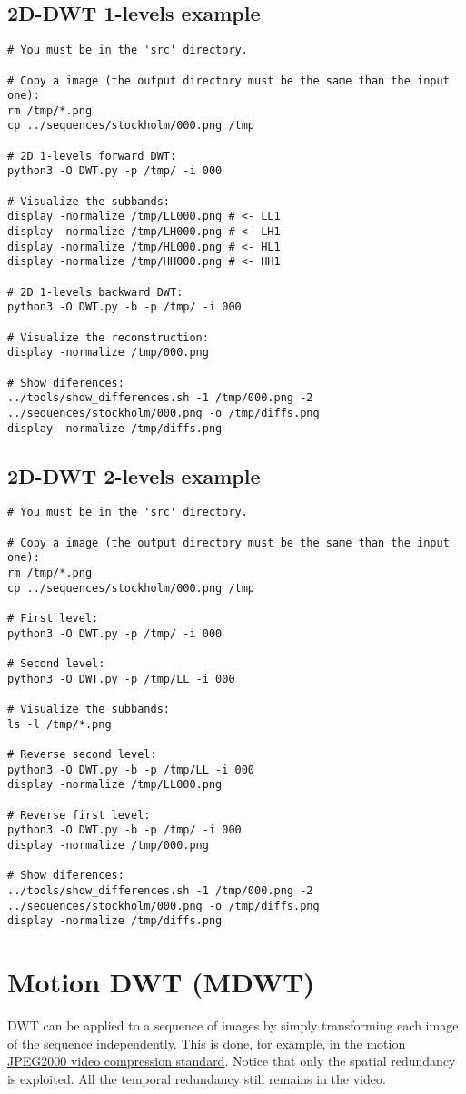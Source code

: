 \subsection{2D-DWT 1-levels example}
\begin{verbatim}
# You must be in the 'src' directory.

# Copy a image (the output directory must be the same than the input one):
rm /tmp/*.png
cp ../sequences/stockholm/000.png /tmp

# 2D 1-levels forward DWT:
python3 -O DWT.py -p /tmp/ -i 000

# Visualize the subbands:
display -normalize /tmp/LL000.png # <- LL1
display -normalize /tmp/LH000.png # <- LH1
display -normalize /tmp/HL000.png # <- HL1
display -normalize /tmp/HH000.png # <- HH1

# 2D 1-levels backward DWT:
python3 -O DWT.py -b -p /tmp/ -i 000

# Visualize the reconstruction:
display -normalize /tmp/000.png 

# Show diferences:
../tools/show_differences.sh -1 /tmp/000.png -2 ../sequences/stockholm/000.png -o /tmp/diffs.png
display -normalize /tmp/diffs.png
\end{verbatim}

\subsection{2D-DWT 2-levels example}
\begin{verbatim}
# You must be in the 'src' directory.

# Copy a image (the output directory must be the same than the input one):
rm /tmp/*.png
cp ../sequences/stockholm/000.png /tmp

# First level:
python3 -O DWT.py -p /tmp/ -i 000

# Second level:
python3 -O DWT.py -p /tmp/LL -i 000

# Visualize the subbands:
ls -l /tmp/*.png

# Reverse second level:
python3 -O DWT.py -b -p /tmp/LL -i 000
display -normalize /tmp/LL000.png

# Reverse first level:
python3 -O DWT.py -b -p /tmp/ -i 000
display -normalize /tmp/000.png

# Show diferences:
../tools/show_differences.sh -1 /tmp/000.png -2 ../sequences/stockholm/000.png -o /tmp/diffs.png
display -normalize /tmp/diffs.png
\end{verbatim}

\section{Motion DWT (MDWT)}
DWT can be applied to a sequence of images by simply transforming each
image of the sequence independently. This is done, for example, in the
\href{https://en.wikipedia.org/wiki/JPEG_2000}{motion JPEG2000 video
  compression standard}. Notice that only the spatial redundancy is
exploited. All the temporal redundancy still remains in the video.

